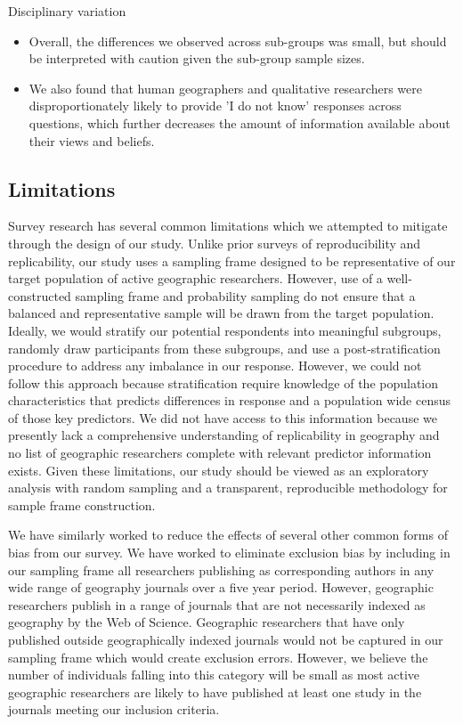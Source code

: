 \documentclass[]{interact}
\theoremstyle{plain}%
\theoremstyle{definition}
\theoremstyle{remark}
\begin{document}
Disciplinary variation
\begin{itemize}
    \item Overall, the differences we observed across sub-groups was small, but should be interpreted with caution given the sub-group sample sizes.
    \item We also found that human geographers and qualitative researchers were disproportionately likely to provide 'I do not know' responses across questions, which further decreases the amount of information available about their views and beliefs. 
\end{itemize}

\subsection*{Limitations} 
Survey research has several common limitations which we attempted to mitigate through the design of our study. 
Unlike prior surveys of reproducibility and replicability, our study uses a sampling frame designed to be representative of our target population of active geographic researchers. 
However, use of a well-constructed sampling frame and probability sampling do not ensure that a balanced and representative sample will be drawn from the target population. 
Ideally, we would stratify our potential respondents into meaningful subgroups, randomly draw participants from these subgroups, and use a post-stratification procedure to address any imbalance in our response. 
However, we could not follow this approach because stratification require knowledge of the population characteristics that predicts differences in response and a population wide census of those key predictors.
We did not have access to this information because we presently lack a comprehensive understanding of replicability in geography and no list of geographic researchers complete with relevant predictor information exists.
Given these limitations, our study should be viewed as an exploratory analysis with random sampling and a transparent, reproducible methodology for sample frame construction.

We have similarly worked to reduce the effects of several other common forms of bias from our survey.
We have worked to eliminate exclusion bias by including in our sampling frame all researchers publishing as corresponding authors in any wide range of geography journals over a five year period.
However, geographic researchers publish in a range of journals that are not necessarily indexed as geography by the Web of Science. 
Geographic researchers that have only published outside geographically indexed journals would not be captured in our sampling frame which would create exclusion errors. 
However, we believe the number of individuals falling into this category will be small as most active geographic researchers are likely to have published at least one study in the journals meeting our inclusion criteria.
\end{document}
